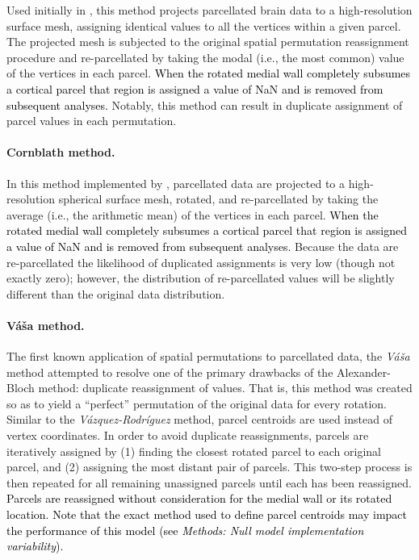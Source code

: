 \documentclass[12pt,aps,pra,reprint,showkeys]{revtex4-1}
\newcommand{\nimg}[1]{\textcolor{black}{{#1}}}
\begin{document}
Used initially in \citet{baum2020pnas}, this method projects parcellated brain data to a high-resolution surface mesh, assigning identical values to all the vertices within a given parcel.
The projected mesh is subjected to the original spatial permutation reassignment procedure \citep[i.e., from][]{alexanderbloch2018neuroimage} and re-parcellated by taking the modal (i.e., the most common) value of the vertices in each parcel.
\nimg{When the rotated medial wall completely subsumes a cortical parcel that region is assigned a value of NaN and is removed from subsequent analyses.}
Notably, this method can result in duplicate assignment of parcel values in each permutation.

\paragraph*{Cornblath method.}

In this method implemented by \citet{cornblath2020commbio}, parcellated data are projected to a high-resolution spherical surface mesh, rotated, and re-parcellated by taking the average (i.e., the arithmetic mean) of the vertices in each parcel.
\nimg{When the rotated medial wall completely subsumes a cortical parcel that region is assigned a value of NaN and is removed from subsequent analyses.}
Because the data are re-parcellated the likelihood of duplicated assignments is very low (though not exactly zero); however, the distribution of re-parcellated values will be slightly different than the original data distribution.

\paragraph*{V{\'a}{\v{s}}a method.}

The first known application of spatial permutations to parcellated data, the \textit{V{\'a}{\v{s}}a} method \citep{vasa2018cercor} attempted to resolve one of the primary drawbacks of the Alexander-Bloch method: duplicate reassignment of values.
That is, this method was created so as to yield a ``perfect'' permutation of the original data for every rotation.
Similar to the \textit{V{\'a}zquez-Rodr{\'i}guez} method, parcel centroids are used instead of vertex coordinates.
In order to avoid duplicate reassignments, parcels are iteratively assigned by (1) finding the closest rotated parcel to each original parcel, and (2) assigning the most distant pair of parcels.
This two-step process is then repeated for all remaining unassigned parcels until each has been reassigned.
\nimg{Parcels are reassigned without consideration for the medial wall or its rotated location.
Note that the exact method used to define parcel centroids may impact the performance of this model (see \textit{Methods: Null model implementation variability}).}
\end{document}
